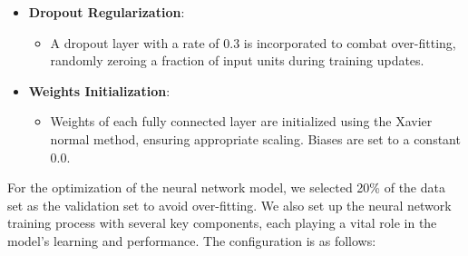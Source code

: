 \documentclass{article}
\begin{document}
\begin{itemize}
    \item \textbf{Dropout Regularization}:
      \begin{itemize}
        \item A dropout layer with a rate of 0.3 is incorporated to combat over-fitting, randomly zeroing a fraction of input units during training updates.
      \end{itemize}

    \item \textbf{Weights Initialization}:
      \begin{itemize}
        \item Weights of each fully connected layer are initialized using the Xavier normal method, ensuring appropriate scaling. Biases are set to a constant 0.0.
      \end{itemize}

\end{itemize}

For the optimization of the neural network model, we selected 20\% of the data set as the validation set to avoid over-fitting. We also set up the neural network training process with several key components, each playing a vital role in the model's learning and performance. The configuration is as follows:
\end{document}
